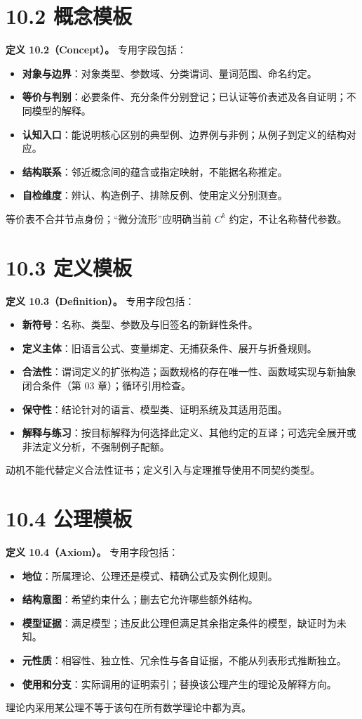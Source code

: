 \documentclass[UTF8,a4paper,zihao=-4,fontset=windows,openany]{ctexbook}
\begin{document}
\section{10.2 概念模板}
\textbf{定义 10.2（Concept）。} 专用字段包括：

\begin{itemize}
\item \textbf{对象与边界}：对象类型、参数域、分类谓词、量词范围、命名约定。
\item \textbf{等价与判别}：必要条件、充分条件分别登记；已认证等价表述及各自证明；不同模型的解释。
\item \textbf{认知入口}：能说明核心区别的典型例、边界例与非例；从例子到定义的结构对应。
\item \textbf{结构联系}：邻近概念间的蕴含或指定映射，不能据名称推定。
\item \textbf{自检维度}：辨认、构造例子、排除反例、使用定义分别测查。
\end{itemize}
等价表不合并节点身份；“微分流形”应明确当前 \(C^k\) 约定，不让名称替代参数。

\section{10.3 定义模板}
\textbf{定义 10.3（Definition）。} 专用字段包括：

\begin{itemize}
\item \textbf{新符号}：名称、类型、参数及与旧签名的新鲜性条件。
\item \textbf{定义主体}：旧语言公式、变量绑定、无捕获条件、展开与折叠规则。
\item \textbf{合法性}：谓词定义的扩张构造；函数规格的存在唯一性、函数域实现与新抽象闭合条件（第 03 章）；循环引用检查。
\item \textbf{保守性}：结论针对的语言、模型类、证明系统及其适用范围。
\item \textbf{解释与练习}：按目标解释为何选择此定义、其他约定的互译；可选完全展开或非法定义分析，不强制例子配额。
\end{itemize}
动机不能代替定义合法性证书；定义引入与定理推导使用不同契约类型。

\section{10.4 公理模板}
\textbf{定义 10.4（Axiom）。} 专用字段包括：

\begin{itemize}
\item \textbf{地位}：所属理论、公理还是模式、精确公式及实例化规则。
\item \textbf{结构意图}：希望约束什么；删去它允许哪些额外结构。
\item \textbf{模型证据}：满足模型；违反此公理但满足其余指定条件的模型，缺证时为未知。
\item \textbf{元性质}：相容性、独立性、冗余性与各自证据，不能从列表形式推断独立。
\item \textbf{使用和分支}：实际调用的证明索引；替换该公理产生的理论及解释方向。
\end{itemize}
理论内采用某公理不等于该句在所有数学理论中都为真。
\end{document}
